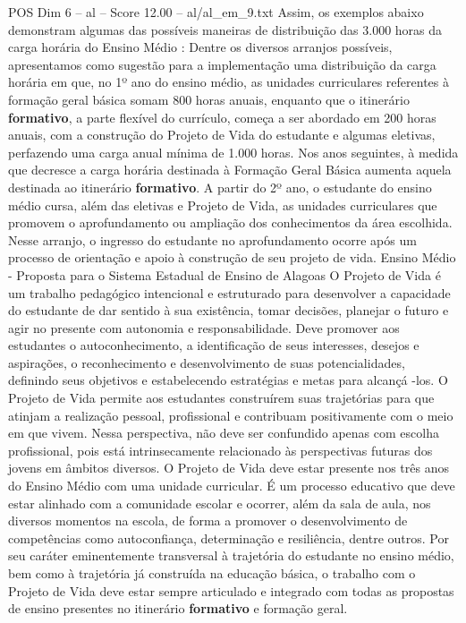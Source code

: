 \begin{textsample}{POS Dim 6 – al – Score 12.00 – al/al\_em\_9.txt}
Assim, os exemplos abaixo demonstram algumas das possíveis maneiras de distribuição das 3.000 horas da carga horária do Ensino Médio : Dentre os diversos arranjos possíveis, apresentamos como sugestão para a implementação uma distribuição da carga horária em que, no 1º ano do ensino médio, as unidades curriculares referentes à formação geral básica somam 800 horas anuais, enquanto que o itinerário \textbf{formativo}, a parte flexível do currículo, começa a ser abordado em 200 horas anuais, com a construção do Projeto de Vida do estudante e algumas eletivas, perfazendo uma carga anual mínima de 1.000 horas.
Nos anos seguintes, à medida que decresce a carga horária destinada à Formação Geral Básica aumenta aquela destinada ao itinerário \textbf{formativo}.
A partir do 2º ano, o estudante do ensino médio cursa, além das eletivas e Projeto de Vida, as unidades curriculares que promovem o aprofundamento ou ampliação dos conhecimentos da área escolhida.
Nesse arranjo, o ingresso do estudante no aprofundamento ocorre após um processo de orientação e apoio à construção de seu projeto de vida.
Ensino Médio - Proposta para o Sistema Estadual de Ensino de Alagoas O Projeto de Vida é um trabalho pedagógico intencional e estruturado para desenvolver a capacidade do estudante de dar sentido à sua existência, tomar decisões, planejar o futuro e agir no presente com autonomia e responsabilidade.
Deve promover aos estudantes o autoconhecimento, a identificação de seus interesses, desejos e aspirações, o reconhecimento e desenvolvimento de suas potencialidades, definindo seus objetivos e estabelecendo estratégias e metas para alcançá -los.
O Projeto de Vida permite aos estudantes construírem suas trajetórias para que atinjam a realização pessoal, profissional e contribuam positivamente com o meio em que vivem.
Nessa perspectiva, não deve ser confundido apenas com escolha profissional, pois está intrinsecamente relacionado às perspectivas futuras dos jovens em âmbitos diversos.
O Projeto de Vida deve estar presente nos três anos do Ensino Médio com uma unidade curricular.
É um processo educativo que deve estar alinhado com a comunidade escolar e ocorrer, além da sala de aula, nos diversos momentos na escola, de forma a promover o desenvolvimento de competências como autoconfiança, determinação e resiliência, dentre outros.
Por seu caráter eminentemente transversal à trajetória do estudante no ensino médio, bem como à trajetória já construída na educação básica, o trabalho com o Projeto de Vida deve estar sempre articulado e integrado com todas as propostas de ensino presentes no itinerário \textbf{formativo} e formação geral.

\end{textsample}
